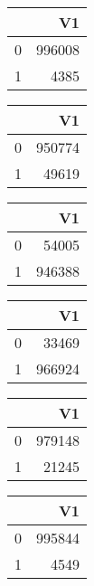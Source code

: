 \bigskip\bigskip
\centering
\begin{tabular}{rr}
  \hline
 & V1 \\ 
  \hline
0 & 996008 \\ 
  1 & 4385 \\ 
   \hline
\end{tabular}

\bigskip\bigskip
\centering
\begin{tabular}{rr}
  \hline
 & V1 \\ 
  \hline
0 & 950774 \\ 
  1 & 49619 \\ 
   \hline
\end{tabular}

\bigskip\bigskip
\centering
\begin{tabular}{rr}
  \hline
 & V1 \\ 
  \hline
0 & 54005 \\ 
  1 & 946388 \\ 
   \hline
\end{tabular}

\bigskip\bigskip
\centering
\begin{tabular}{rr}
  \hline
 & V1 \\ 
  \hline
0 & 33469 \\ 
  1 & 966924 \\ 
   \hline
\end{tabular}

\bigskip\bigskip
\centering
\begin{tabular}{rr}
  \hline
 & V1 \\ 
  \hline
0 & 979148 \\ 
  1 & 21245 \\ 
   \hline
\end{tabular}

\bigskip\bigskip
\centering
\begin{tabular}{rr}
  \hline
 & V1 \\ 
  \hline
0 & 995844 \\ 
  1 & 4549 \\ 
   \hline
\end{tabular}

